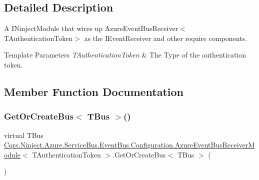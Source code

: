\subsection{Detailed Description}
A I\+Ninject\+Module that wires up Azure\+Event\+Bus\+Receiver$<$\+T\+Authentication\+Token$>$ as the I\+Event\+Receiver and other require components. 


\begin{DoxyTemplParams}{Template Parameters}
{\em T\+Authentication\+Token} & The Type of the authentication token.\\
\hline
\end{DoxyTemplParams}


\subsection{Member Function Documentation}
\mbox{\label{classCqrs_1_1Ninject_1_1Azure_1_1ServiceBus_1_1EventBus_1_1Configuration_1_1AzureEventBusReceiverModule_a421f5ac0599f0d3d5be569cc954be73b_a421f5ac0599f0d3d5be569cc954be73b}} 
\subsubsection{\texorpdfstring{Get\+Or\+Create\+Bus$<$ T\+Bus $>$()}{GetOrCreateBus< TBus >()}}
{\footnotesize\ttfamily virtual T\+Bus \hyperlink{classCqrs_1_1Ninject_1_1Azure_1_1ServiceBus_1_1EventBus_1_1Configuration_1_1AzureEventBusReceiverModule}{Cqrs.\+Ninject.\+Azure.\+Service\+Bus.\+Event\+Bus.\+Configuration.\+Azure\+Event\+Bus\+Receiver\+Module}$<$ T\+Authentication\+Token $>$.Get\+Or\+Create\+Bus$<$ T\+Bus $>$ (\begin{DoxyParamCaption}{ }\end{DoxyParamCaption})\hspace{0.3cm}{\ttfamily [virtual]}}



